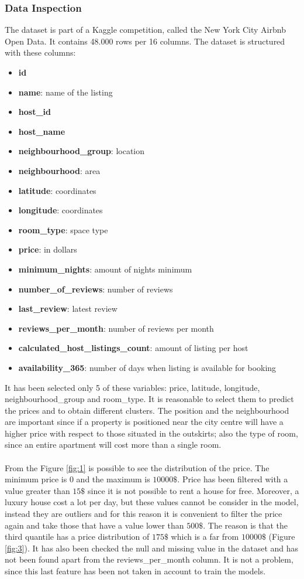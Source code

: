 \documentclass{FR16}
\begin{document}
\subsubsection{Data Inspection}
The dataset is part of a Kaggle competition, called the New York City Airbnb Open Data. It contains 48.000 rows per 16 columns.
The dataset is structured with these columns: 
\begin{itemize}
\itemsep0em 
\item \textbf{id}
\item \textbf{name}: name of the listing
\item \textbf{host\_id}
\item \textbf{host\_name}
\item \textbf{neighbourhood\_group}: location
\item \textbf{neighbourhood}: area
\item \textbf{latitude}: coordinates
\item \textbf{longitude}: coordinates
\item \textbf{room\_type}: space type
\item \textbf{price}:  in dollars
\item \textbf{minimum\_nights}: amount of nights minimum
\item \textbf{number\_of\_reviews}: number of reviews
\item \textbf{last\_review}: latest review
\item \textbf{reviews\_per\_month}: number of reviews per month
\item \textbf{calculated\_host\_listings\_count}: amount of listing per host
\item  \textbf{availability\_365}: number of days when listing is available for booking\\
\end{itemize}
It has been selected only 5 of these variables: price, latitude, longitude, neighbourhood\_group and room\_type. It is reasonable to select them to predict the prices and to obtain different clusters. The position and the neighbourhood are important since if a property is positioned near the city centre will have a higher price with respect to those situated in the outskirts; also the type of room, since an entire apartment will cost more than a single room. \\\\
From the Figure \ref{fig:1} is possible to see the distribution of the price. The minimum price is $0$ and the maximum is $10000\$$. Price has been filtered with a value greater than  $15\$$ since it is not possible to rent a house for free. Moreover, a luxury house cost a lot per day, but these values cannot be consider in the model, instead they are outliers and for this reason it is convenient to filter the price again and take those that have a value lower than $500\$$. The reason is that the third quantile has a price distribution of $175\$$ which is a far from $10000\$$ (Figure \ref{fig:3}). It has also been checked the null and missing value  in the dataset and has not been found apart from the reviews\_per\_month column. It is not a problem, since this last feature has been not taken in account to train the models. 
\end{document}
